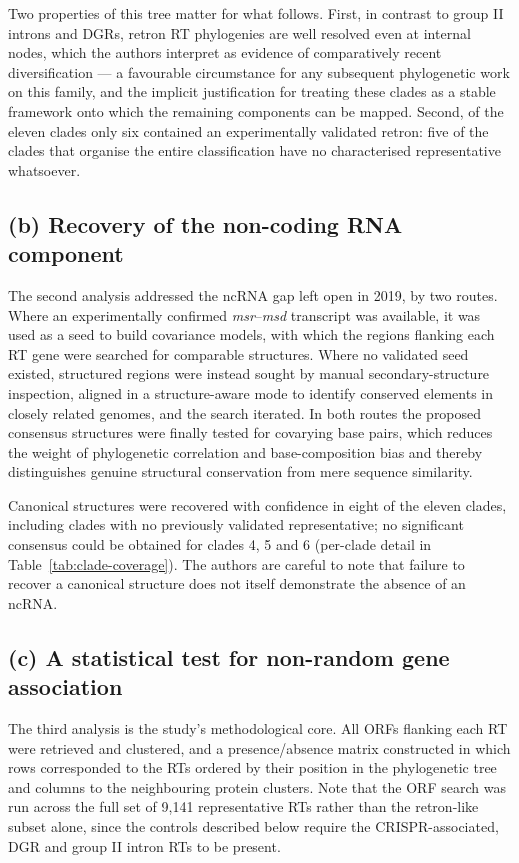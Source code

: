Two properties of this tree matter for what follows. First, in contrast to group II introns and
DGRs, retron RT phylogenies are well resolved even at internal nodes, which the authors interpret
as evidence of comparatively recent diversification --- a favourable circumstance for any
subsequent phylogenetic work on this family, and the implicit justification for treating these
clades as a stable framework onto which the remaining components can be mapped. Second, of the
eleven clades only six contained an experimentally validated retron: five of the clades that
organise the entire classification have no characterised representative whatsoever.


\subsection{(b) Recovery of the non-coding RNA component}
 
The second analysis addressed the ncRNA gap left open in 2019, by two routes. Where an
experimentally confirmed \textit{msr}--\textit{msd} transcript was available, it was used as a seed
to build covariance models, with which the regions flanking each RT gene were searched for
comparable structures. Where no validated seed existed, structured regions were instead sought by
manual secondary-structure inspection, aligned in a structure-aware mode to identify conserved
elements in closely related genomes, and the search iterated. In both routes the proposed
consensus structures were finally tested for covarying base pairs, which reduces the weight of
phylogenetic correlation and base-composition bias and thereby distinguishes genuine structural
conservation from mere sequence similarity.
 
Canonical structures were recovered with confidence in eight of the eleven clades, including
clades with no previously validated representative; no significant consensus could be obtained for
clades 4, 5 and 6 (per-clade detail in Table~\ref{tab:clade-coverage}). The authors are careful to
note that failure to recover a canonical structure does not itself demonstrate the absence of an
ncRNA.


\subsection{(c) A statistical test for non-random gene association}
 
The third analysis is the study's methodological core. All ORFs flanking each RT were retrieved
and clustered, and a presence/absence matrix constructed in which rows corresponded to the RTs
ordered by their position in the phylogenetic tree and columns to the neighbouring protein
clusters. Note that the ORF search was run across the full set of 9{,}141 representative RTs
rather than the retron-like subset alone, since the controls described below require the
CRISPR-associated, DGR and group II intron RTs to be present.
 
